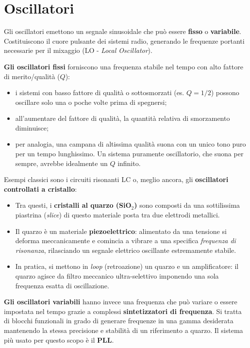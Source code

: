 \documentclass[openany,a4paper,12pt]{book}
\begin{document}
\section{Oscillatori}

Gli oscillatori emettono un segnale sinusoidale che può essere \textbf{fisso} o \textbf{variabile}. Costituiscono il cuore pulsante dei sistemi radio, generando le frequenze portanti necessarie per il mixaggio (LO - \textit{Local Oscillator}).

\textbf{Gli oscillatori fissi} forniscono una frequenza stabile nel tempo con alto fattore di merito/qualità ($Q$):
\begin{itemize}[label=\textcolor{PoliBlue}{\textbullet}]
    \item i sistemi con basso fattore di qualità o sottosmorzati (es. $Q = 1/2$) possono oscillare solo una o poche volte prima di spegnersi;
    \item all'aumentare del fattore di qualità, la quantità relativa di smorzamento diminuisce;
    \item per analogia, una campana di altissima qualità suona con un unico tono puro per un tempo lunghissimo. Un sistema puramente oscillatorio, che suona per sempre, avrebbe idealmente un $Q$ infinito.
\end{itemize}

Esempi classici sono i circuiti risonanti LC o, meglio ancora, gli \textbf{oscillatori controllati a cristallo}:
\begin{itemize}[label=\textcolor{ForestGreen}{\textbullet}]
    \item Tra questi, i \textbf{cristalli al quarzo (SiO$_2$)} sono composti da una sottilissima piastrina (\textit{slice}) di questo materiale posta tra due elettrodi metallici.
    \item Il quarzo è un materiale \textbf{piezoelettrico}: alimentato da una tensione si deforma meccanicamente e comincia a vibrare a una specifica \textit{frequenza di risonanza}, rilasciando un segnale elettrico oscillante estremamente stabile.
    \item In pratica, si mettono in \textit{loop} (retroazione) un quarzo e un amplificatore: il quarzo agisce da filtro meccanico ultra-selettivo imponendo una sola frequenza esatta di oscillazione.
\end{itemize}

\textbf{Gli oscillatori variabili} hanno invece una frequenza che può variare o essere impostata nel tempo grazie a complessi \textbf{sintetizzatori di frequenza}. Si tratta di blocchi funzionali in grado di generare frequenze in una gamma desiderata mantenendo la stessa precisione e stabilità di un riferimento a quarzo. Il sistema più usato per questo scopo è il \textbf{PLL}.
\end{document}

